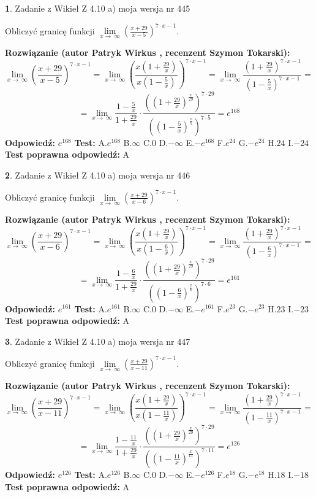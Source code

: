 \documentclass[12pt, a4paper]{article}
\theoremstyle{definition} %
\newtheorem{zad}{}
\newcommand{\zadStart}[1]{\begin{zad}#1\newline}
\newcommand{\zadStop}{\end{zad}}
\newcommand{\rozwStart}[2]{\noindent \textbf{Rozwiązanie (autor #1 , recenzent #2): }\newline}
\newcommand{\rozwStop}{\newline}
\newcommand{\odpStart}{\noindent \textbf{Odpowiedź:}\newline}
\newcommand{\odpStop}{\newline}
\newcommand{\testStart}{\noindent \textbf{Test:}\newline}
\newcommand{\testStop}{\newline}
\newcommand{\kluczStart}{\noindent \textbf{Test poprawna odpowiedź:}\newline}
\newcommand{\kluczStop}{\newline}
\begin{document}
\zadStart{Zadanie z Wikieł Z 4.10 a) moja wersja nr 445}

Obliczyć granicę funkcji  $\lim\limits_{x\to\ \infty}(\frac{x+29}{x-5})^{7\cdot x-1}$.
\zadStop
\rozwStart{Patryk Wirkus}{Szymon Tokarski}
$$\lim\limits_{x\to\ \infty}(\frac{x+29}{x-5})^{7\cdot x-1} = \lim\limits_{x\to\ \infty}(\frac{x(1+\frac{29}{x})}{x(1-\frac{5}{x})})^{7\cdot x-1}=\lim\limits_{x\to\ \infty}\frac{(1+\frac{29}{x})^{7\cdot x-1}}{(1-\frac{5}{x})^{7\cdot x-1}}=$$
$$=\lim\limits_{x\to\ \infty}\frac{1-\frac{5}{x}}{1+\frac{29}{x}}\cdot\frac{((1+\frac{29}{x})^{\frac{x}{29}})^{7\cdot29}}{((1-\frac{5}{x})^{\frac{x}{5}})^{7\cdot5}}=e^{168}$$
\rozwStop
\odpStart
$e^{168}$
\odpStop
\testStart
A.$e^{168}$ B.$\infty$ C.$0$ D.$-\infty$ E.$-e^{168}$
F.$e^{24}$ G.$-e^{24}$
H.$24$
I.$-24$
\testStop
\kluczStart
A
\kluczStop



\zadStart{Zadanie z Wikieł Z 4.10 a) moja wersja nr 446}

Obliczyć granicę funkcji  $\lim\limits_{x\to\ \infty}(\frac{x+29}{x-6})^{7\cdot x-1}$.
\zadStop
\rozwStart{Patryk Wirkus}{Szymon Tokarski}
$$\lim\limits_{x\to\ \infty}(\frac{x+29}{x-6})^{7\cdot x-1} = \lim\limits_{x\to\ \infty}(\frac{x(1+\frac{29}{x})}{x(1-\frac{6}{x})})^{7\cdot x-1}=\lim\limits_{x\to\ \infty}\frac{(1+\frac{29}{x})^{7\cdot x-1}}{(1-\frac{6}{x})^{7\cdot x-1}}=$$
$$=\lim\limits_{x\to\ \infty}\frac{1-\frac{6}{x}}{1+\frac{29}{x}}\cdot\frac{((1+\frac{29}{x})^{\frac{x}{29}})^{7\cdot29}}{((1-\frac{6}{x})^{\frac{x}{6}})^{7\cdot6}}=e^{161}$$
\rozwStop
\odpStart
$e^{161}$
\odpStop
\testStart
A.$e^{161}$ B.$\infty$ C.$0$ D.$-\infty$ E.$-e^{161}$
F.$e^{23}$ G.$-e^{23}$
H.$23$
I.$-23$
\testStop
\kluczStart
A
\kluczStop



\zadStart{Zadanie z Wikieł Z 4.10 a) moja wersja nr 447}

Obliczyć granicę funkcji  $\lim\limits_{x\to\ \infty}(\frac{x+29}{x-11})^{7\cdot x-1}$.
\zadStop
\rozwStart{Patryk Wirkus}{Szymon Tokarski}
$$\lim\limits_{x\to\ \infty}(\frac{x+29}{x-11})^{7\cdot x-1} = \lim\limits_{x\to\ \infty}(\frac{x(1+\frac{29}{x})}{x(1-\frac{11}{x})})^{7\cdot x-1}=\lim\limits_{x\to\ \infty}\frac{(1+\frac{29}{x})^{7\cdot x-1}}{(1-\frac{11}{x})^{7\cdot x-1}}=$$
$$=\lim\limits_{x\to\ \infty}\frac{1-\frac{11}{x}}{1+\frac{29}{x}}\cdot\frac{((1+\frac{29}{x})^{\frac{x}{29}})^{7\cdot29}}{((1-\frac{11}{x})^{\frac{x}{11}})^{7\cdot11}}=e^{126}$$
\rozwStop
\odpStart
$e^{126}$
\odpStop
\testStart
A.$e^{126}$ B.$\infty$ C.$0$ D.$-\infty$ E.$-e^{126}$
F.$e^{18}$ G.$-e^{18}$
H.$18$
I.$-18$
\testStop
\kluczStart
A
\kluczStop
\end{document}

